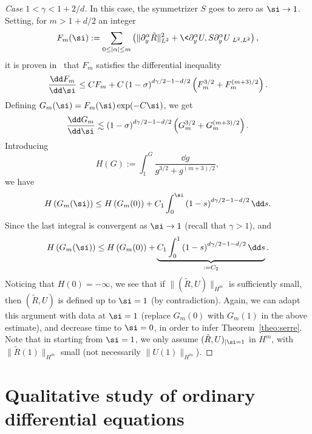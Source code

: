 \begin{proof}[Case $1<\gamma<1+2/d$]
In this case, the symmetrizer $S$ goes to zero as $\si\to 1$. Setting, for $m>1+d/2$ an integer
\begin{equation*}
F_m(\si) :=\sum_{0\le |\alpha|\le m}\left(\|\partial_y^\alpha \tilde R\|_{L^2}^2 +
\<\partial_y^\alpha U,S\partial_y^\alpha U\>_{L^2,L^2}\right),
\end{equation*}
it is proven in~\cite{Serre97} that $F_m$ satisfies the differential inequality
\begin{equation*}
\frac{\dd F_m}{\dd\si}\le C F_m+C \left(1-\sigma\right)^{d\gamma/2-1-d/2}\left(F_m^{3/2}+F_m^{(m+3)/2}\right).
\end{equation*}
Defining $G_m(\si)=F_m(\si)\exp(-C\si)$, we get
\begin{equation*}
\frac{\dd G_m}{\dd\si}\lesssim
\left(1-\sigma\right)^{d\gamma/2-1-d/2}\left(G_m^{3/2}+G_m^{(m+3)/2}\right).
\end{equation*}
Introducing
\begin{equation*}
H(G):= \int_1^G \frac{\dd g}{g^{3/2}+g^{(m+3)/2}},
\end{equation*}
we have
\begin{equation*}
H\left(G_m(\si)\right) \le H\left(G_m(0)\right) +C_1 \int_0^\si
\left(1-s\right)^{d\gamma/2-1-d/2}\dd s.
\end{equation*}
Since the last integral is convergent as $\si\to 1$ (recall that $\gamma>1$), and
\begin{equation*}
H\left(G_m(\si)\right) \le H\left(G_m(0)\right) +\underbrace{C_1 \int_0^1
\left(1-s\right)^{d\gamma/2-1-d/2}\dd s}_{:=C_2}.
\end{equation*}
Noticing that $H(0)=-\infty$, we see that if $\|(\tilde R,U)\|_{H^m}$ is sufficiently small, then $(\tilde R,U)$ is defined up to $\si=1$ (by contradiction). Again, we can adapt this argument with data at $\si=1$ (replace $G_m(0)$ with $G_m(1)$ in the above estimate), and decrease time to $\si=0$, in order to infer Theorem~\ref{theo:serre}. Note that in starting from $\si=1$, we only assume $(\tilde R,U)_{\mid \si=1}$ in $H^m$, with $\|\tilde R(1)\|_{H^m}$ small (not necessarily $\|U(1)\|_{H^m}$).
\let\qed\relax
\end{proof}

\section{Qualitative study of ordinary differential equations}\label{sec:ODE}


